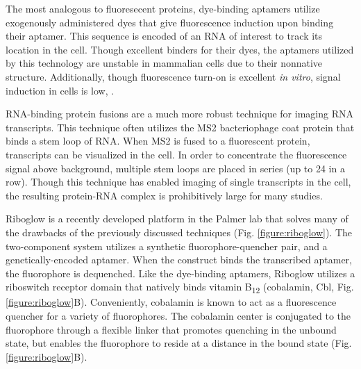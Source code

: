 The most analogous to fluoresecent proteins, dye-binding aptamers utilize exogenously administered dyes that give fluorescence induction upon binding their aptamer.\cite{PaigeRNAMimicsGreen2011,FilonovBroccoliRapidSelection2014,AutourFluorogenicRNAMango2018,DolgosheinaRNAMangoAptamerFluorophore2014} This sequence is encoded  of an RNA of interest to track its location in the cell. Though excellent binders for their dyes, the aptamers utilized by this technology are unstable in mammalian cells due to their nonnative structure.\cite{EtzelSyntheticRiboswitchesPlug2017} Additionally, though fluorescence turn-on is excellent \textit{in vitro}, signal induction in cells is low, .

RNA-binding protein fusions are a much more robust technique for imaging RNA transcripts.\cite{FuscoSinglemRNAMolecules2003} This technique often utilizes the MS2 bacteriophage coat protein that binds a stem loop of RNA. When MS2 is fused to a fluorescent protein, transcripts can be visualized in the cell. In order to concentrate the fluorescence signal above background, multiple stem loops are placed in series (up to 24 in a row). Though this technique has enabled imaging of single transcripts in the cell,\cite{MorisakiRealtimequantificationsingle2016,FuscoSinglemRNAMolecules2003} the resulting protein-RNA complex is prohibitively large for many studies.


Riboglow is a recently developed platform in the Palmer lab that solves many of the drawbacks of the previously discussed techniques (Fig. \ref{figure:riboglow}). The two-component system utilizes a synthetic fluorophore-quencher pair, and a genetically-encoded aptamer. When the construct binds the transcribed aptamer, the fluorophore is dequenched. Like the dye-binding aptamers, Riboglow utilizes a riboswitch receptor domain that natively binds vitamin B\textsubscript{12} (cobalamin, Cbl, Fig. \ref{figure:riboglow}B).\cite{JohnsonJrB12cofactorsdirectly2012} Conveniently, cobalamin is known to act as a fluorescence quencher for a variety of fluorophores.\comment{[cite]} The cobalamin center is conjugated to the fluorophore through a flexible linker that promotes quenching in the unbound state, but enables the fluorophore to reside at a distance in the bound state (Fig. \ref{figure:riboglow}B). 

